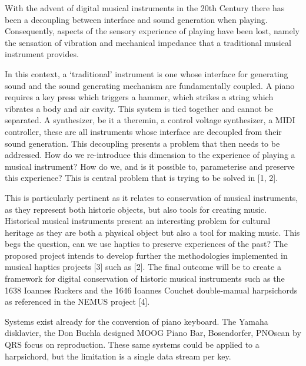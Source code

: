 With the advent of digital musical instruments in the 20th Century there
has been a decoupling between interface and sound generation when
playing. Consequently, aspects of the sensory experience of playing have
been lost, namely the sensation of vibration and mechanical impedance
that a traditional musical instrument provides.

In this context, a `traditional' instrument is one whose interface for
generating sound and the sound generating mechanism are fundamentally
coupled. A piano requires a key press which triggers a hammer, which
strikes a string which vibrates a body and air cavity. This system is
tied together and cannot be separated. A synthesizer, be it a theremin,
a control voltage synthesizer, a MIDI controller, these are all
instruments whose interface are decoupled from their sound generation.
This decoupling presents a problem that then needs to be addressed. How
do we re-introduce this dimension to the experience of playing a musical
instrument? How do we, and is it possible to, parameterise and preserve
this experience? This is central problem that is trying to be solved in
{[}1, 2{]}.

This is particularly pertinent as it relates to conservation of musical
instruments, as they represent both historic objects, but also tools for
creating music. Historical musical instruments present an interesting
problem for cultural heritage as they are both a physical object but
also a tool for making music. This begs the question, can we use haptics
to preserve experiences of the past? The proposed project intends to
develop further the methodologies implemented in musical haptics
projects {[}3{]} such as {[}2{]}. The final outcome will be to create a
framework for digital conservation of historic musical instruments such
as the 1638 Ioannes Ruckers and the 1646 Ioannes Couchet double-manual
harpsichords as referenced in the NEMUS project {[}4{]}.

Systems exist already for the conversion of piano keyboard. The Yamaha
disklavier, the Don Buchla designed MOOG Piano Bar, Bosendorfer, PNOscan
by QRS focus on reproduction. These same systems could be applied to a
harpsichord, but the limitation is a single data stream per key.

